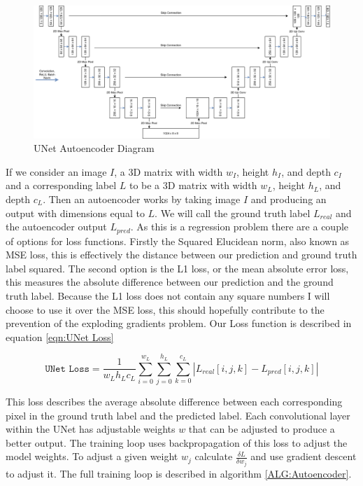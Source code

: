 \documentclass{UoYCSproject}
\begin{document}
\begin{figure}[ht]
    \centering
    \includegraphics[width=\linewidth]{UNet Diagram}
    \caption{UNet Autoencoder Diagram}
    \label{fig:autoencoderDiagram}
\end{figure}

If we consider an image $ I $, a 3D matrix with width $ w_I $, height $ h_I $, and depth $ c_I $ and a corresponding label $ L $ to be a 3D matrix with width $ w_L $, height $ h_L $, and depth $ c_L $. Then an autoencoder works by taking image $ I $ and producing an output with dimensions equal to $ L $. We will call the ground truth label $ L_{real} $ and the autoencoder output $ L_{pred} $. As this is a regression problem there are a couple of options for loss functions. Firstly the Squared Elucidean norm, also known as MSE loss, this is effectively the distance between our prediction and ground truth label squared. The second option is the L1 loss, or the mean absolute error loss, this measures the absolute difference between our prediction and the ground truth label.
Because the L1 loss does not contain any square numbers I will choose to use it over the MSE loss, this should hopefully contribute to the prevention of the exploding gradients problem. Our Loss function is described in equation \ref{eqn:UNet Loss}

\begin{equation}
    \label{eqn:UNet Loss}
    \texttt{UNet Loss} = \frac{1}{w_L h_L c_L} \sum_{i = 0}^{w_L} \sum_{j = 0}^{h_L} \sum_{k = 0}^{c_L}  \left\lvert L_{real}[i,j,k] - L_{pred}[i,j,k]\right\rvert   
\end{equation}

This loss describes the average absolute difference between each corresponding pixel in the ground truth label and the predicted label. Each convolutional layer within the UNet has adjustable weights $w$ that can be adjusted to produce a better output. The training loop uses backpropagation of this loss to adjust the model weights. To adjust a given weight $w_j$ calculate $ \frac{\delta L}{\delta w_j} $ and use gradient descent to adjust it. The full training loop is described in algorithm \ref{ALG:Autoencoder}.
\end{document}
